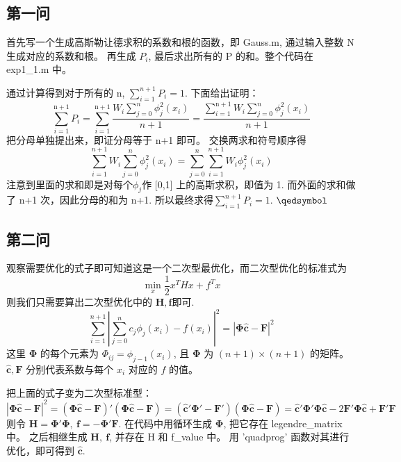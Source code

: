 \subsection{第一问}
首先写一个生成高斯勒让德求积的系数和根的函数，即 Gauss.m, 通过输入整数 N 生成对应的系数和根。
再生成 $P_i$, 最后求出所有的 P 的和。整个代码在 exp1\_1.m 中。

通过计算得到对于所有的 n, \(\sum_{i=1}^{n+1}P_i=1\).
下面给出证明：
\begin{equation}
	\sum_{i=1}^{\mathrm{n}+1} P_{i}=\sum_{i=1}^{\mathrm{n}+1} \frac{W_{i} \sum_{j=0}^{n} \phi_{j}^{2}\left(x_{i}\right)}{n+1}
	= \frac{\sum_{i=1}^{\mathrm{n}+1}W_{i} \sum_{j=0}^{n} \phi_{j}^{2}\left(x_{i}\right)}{n+1}
\end{equation}
把分母单独提出来，即证分母等于 n+1 即可。
交换两求和符号顺序得
\begin{equation}
	\sum_{i=1}^{n+1}W_{i} \sum_{j=0}^{n} \phi_{j}^{2}\left(x_{i}\right)=\sum_{j=0}^{n}\sum_{i=1}^{n+1}W_i\phi_{j}^2(x_i)
\end{equation}
注意到里面的求和即是对每个$\phi_j$作 [0,1] 上的高斯求积，即值为 1.
而外面的求和做了 n+1 次，因此分母的和为 n+1.
所以最终求得\(\sum_{i=1}^{n+1}P_i=1\). \hfill \(\qedsymbol\)

\subsection{第二问}
观察需要优化的式子即可知道这是一个二次型最优化，而二次型优化的标准式为
\begin{equation}
	\min _{x} \frac{1}{2} x^{T} H x+f^{T} x
\end{equation}
则我们只需要算出二次型优化中的 $\mathbf{H,f}$即可.
\begin{equation}
	\sum_{i=1}^{n+1}\left|\sum_{j=0}^{n} c_{j} \phi_{j}\left(x_{i}\right)-f\left(x_{i}\right)\right|^{2}=
	|\mathbf{\Phi} \mathbf {\hat{c}}-\mathbf F|^2
\end{equation}
这里 $\mathbf{\Phi}$ 的每个元素为 $\Phi_{ij}=\phi _{j-1}(x_i)$, 且 \(\mathbf{\Phi}\) 为 \((n+1)\times(n+1)\) 的矩阵。
\(\mathbf{\hat{c},F}\) 分别代表系数与每个 \(x_i\) 对应的 \(f\) 的值。

把上面的式子变为二次型标准型：
\begin{equation}
	|\mathbf{\Phi} \mathbf{\hat{c}}-\mathbf F|^2=(\mathbf{\Phi} \mathbf {\hat{c}}-\mathbf F)'(\mathbf{\Phi} \mathbf {\hat{c}}-\mathbf F)=
	(\mathbf{\hat{c}}'\mathbf{\Phi}'-\mathbf{F}')(\mathbf{\Phi} \mathbf {\hat{c}}-\mathbf F)=
	\mathbf{\hat{c}}'\mathbf{\Phi}'\mathbf{\Phi}\mathbf{\hat{c}}-2\mathbf{F}'\mathbf{\Phi}\mathbf{\hat{c}}+\mathbf{F}'\mathbf{F}
\end{equation}
则令 \(\mathbf{H}=\mathbf{\Phi'\Phi},\ \mathbf{f}=-\mathbf{\Phi' F}\).
在代码中用循环生成 \(\mathbf{\Phi}\), 把它存在 legendre\_matrix 中。
之后相继生成 \(\mathbf{H},\ \mathbf{f}\), 并存在 H 和 f\_value 中。
用 'quadprog' 函数对其进行优化，即可得到 \(\mathbf{\hat{c}}\).

